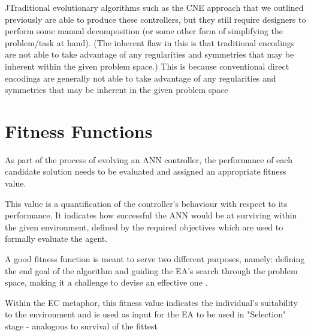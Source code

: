 ^^
Traditional evolutionary algorithms such as the CNE approach that we outlined previously are able to produce these controllers, but they still require designers to perform some manual decomposition (or some other form of simplifying the problem/task at hand). 
(The inherent flaw in this is that traditional encodings are not able to take advantage of any regularities and symmetries that may be inherent within the given problem space.)
This is because conventional direct encodings are generally not able to take advantage of any regularities and symmetries that may be inherent in the given problem space


\section{Fitness Functions}


As part of the process of evolving an ANN controller, the performance of each candidate solution needs to be evaluated and assigned an appropriate fitness value. 

This value is a quantification of the controller's behaviour with respect to its performance. It indicates how successful the ANN would be at surviving within the given environment, defined by the required objectives which are used to formally evaluate the agent.

A good fitness function is meant to serve two different purposes, namely: defining the end goal of the algorithm and guiding the EA's search through the problem space, making it a challenge to devise an effective one \cite{RefWorks:9}.

Within the EC metaphor, this fitness value indicates the individual's suitability to the environment and is used as input for the EA to be used in "Selection" stage  - analogous to survival of the fittest

